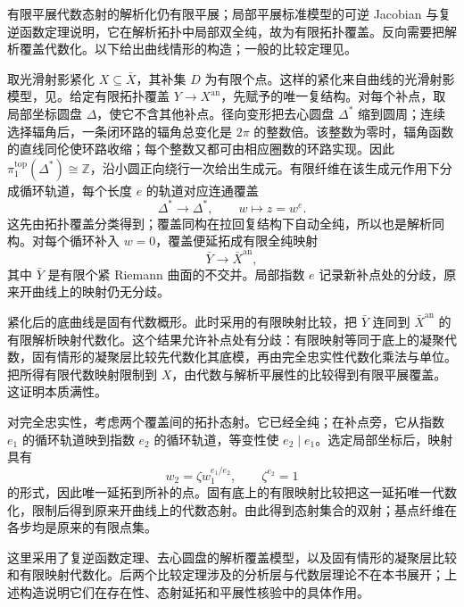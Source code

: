 \begin{proofsketch}
	有限平展代数态射的解析化仍有限平展；局部平展标准模型的可逆 Jacobian 与复逆函数定理说明，它在解析拓扑中局部双全纯，故为有限拓扑覆盖。反向需要把解析覆盖代数化。以下给出曲线情形的构造；一般的比较定理见\cite[Exposé XII, Théorème 5.1, pp. 251--253]{SGA12003}。

	取光滑射影紧化 \(X\subseteq\bar X\)，其补集 \(D\) 为有限个点。这样的紧化来自曲线的光滑射影模型，见\cite[Chapter I, Corollary 6.10, p. 45]{Hartshorne1977}。给定有限拓扑覆盖 \(Y\rightarrow X^{\mathrm{an}}\)，先赋予的唯一复结构。对每个补点，取局部坐标圆盘 \(\Delta\)，使它不含其他补点。径向变形把去心圆盘 \(\Delta^*\) 缩到圆周；连续选择辐角后，一条闭环路的辐角总变化是 \(2\pi\) 的整数倍。该整数为零时，辐角函数的直线同伦使环路收缩；每个整数又都可由相应圈数的环路实现。因此 \(\pi_1^{\mathrm{top}}(\Delta^*)\cong\mathbb Z\)，沿小圆正向绕行一次给出生成元。有限纤维在该生成元作用下分成循环轨道，每个长度 \(e\) 的轨道对应连通覆盖
	\[
		\Delta^*\longrightarrow\Delta^*,\qquad w\longmapsto z=w^e.
	\]
	这先由拓扑覆盖分类得到；覆盖同构在拉回复结构下自动全纯，所以也是解析同构。对每个循环补入 \(w=0\)，覆盖便延拓成有限全纯映射
	\[
		\bar Y\longrightarrow\bar X^{\mathrm{an}},
	\]
	其中 \(\bar Y\) 是有限个紧 Riemann 曲面的不交并。局部指数 \(e\) 记录新补点处的分歧，原来开曲线上的映射仍无分歧。

	紧化后的底曲线是固有代数概形。此时采用\cite[Exposé XII, Corollaire 4.6, p. 251]{SGA12003}的有限映射比较，把 \(\bar Y\) 连同到 \(\bar X^{\mathrm{an}}\) 的有限解析映射代数化。这个结果允许补点处有分歧：有限映射等同于底上的凝聚代数，固有情形的凝聚层比较先代数化其底模，再由完全忠实性代数化乘法与单位。把所得有限代数映射限制到 \(X\)，由代数与解析平展性的比较\cite[Exposé XII, Proposition 3.1(iii), pp. 244--245]{SGA12003}得到有限平展覆盖。这证明本质满性。

	对完全忠实性，考虑两个覆盖间的拓扑态射。它已经全纯；在补点旁，它从指数 \(e_1\) 的循环轨道映到指数 \(e_2\) 的循环轨道，等变性使 \(e_2\mid e_1\)。选定局部坐标后，映射具有
	\[
		w_2=\zeta w_1^{e_1/e_2},\qquad \zeta^{e_2}=1
	\]
	的形式，因此唯一延拓到所补的点。固有底上的有限映射比较把这一延拓唯一代数化，限制后得到原来开曲线上的代数态射。由此得到态射集合的双射；基点纤维在各步均是原来的有限点集。

	这里采用了复逆函数定理、去心圆盘的解析覆盖模型，以及固有情形的凝聚层比较和有限映射代数化。后两个比较定理涉及的分析层与代数层理论不在本书展开；上述构造说明它们在存在性、态射延拓和平展性核验中的具体作用。
\end{proofsketch}

